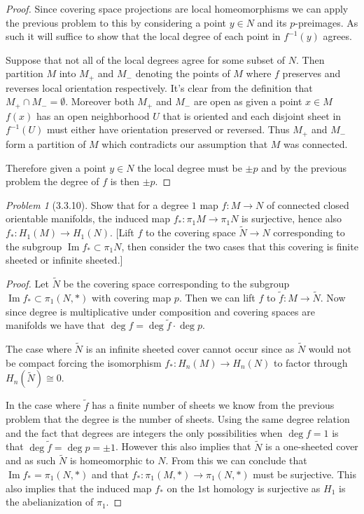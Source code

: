 \documentclass[10pt]{article}
\newcommand{\sk}{\vskip 10mm}
\newcommand{\wt}[1]{\widetilde{#1}}
\DeclareMathOperator{\img}{Im}
\theoremstyle{remark}
\newtheorem{problem}{Problem}
\begin{document}
\begin{proof}
  Since covering space projections are local homeomorphisms we can apply the previous
  problem to this by considering a point $y\in N$ and its $p$-preimages. As such
  it will suffice to show that the local degree of each point in $f^{-1}(y)$
  agrees.

  Suppose that not all of the local degrees agree for some subset of $N$. Then
  partition $M$ into $M_+$ and $M_-$ denoting the points of $M$ where $f$ preserves
  and reverses local orientation respectively. It's clear from the definition
  that $M_+\cap M_-=\emptyset$. Moreover both $M_+$ and $M_-$ are open as given a point $x\in M$
  $f(x)$ has an open neighborhood $U$ that is oriented and each disjoint sheet in
  $f^{-1}(U)$ must either have orientation preserved or reversed. Thus $M_+$ and
  $M_-$ form a partition of $M$ which contradicts our assumption that $M$ was
  connected.

  Therefore given a point $y\in N$ the local degree must be $\pm p$ and by the
  previous problem the degree of $f$ is then $\pm p$.
\end{proof}

\sk

\begin{problem}[3.3.10]
  Show that for a degree $1$ map $f:M\rightarrow N$ of connected closed
  orientable manifolds, the induced map $f_*:\pi_1 M\rightarrow \pi_1 N$ is
  surjective, hence also $f_*:H_1(M)\rightarrow H_1(N)$. [Lift $f$ to the
  covering space $\wt{N}\rightarrow N$ corresponding to the subgroup
  $\img f_*\subset\pi_1 N$, then consider the two cases that this covering is
  finite sheeted or infinite sheeted.]
\end{problem}

\begin{proof}
  Let $\wt{N}$ be the covering space corresponding to the subgroup
  $\img f_* \subset\pi_1(N,*)$ with covering map $p$. Then we can lift $f$
  to $\wt{f}:M\rightarrow\wt{N}$. Now since degree is multiplicative under composition
  and covering spaces are manifolds we have that $\deg f=\deg \wt{f}\cdot \deg p$.

  The case where $\wt{N}$ is an infinite sheeted cover cannot occur since
  as $\wt{N}$ would not be compact forcing the isomorphism $f_*:H_n(M)\rightarrow H_n(N)$
  to factor through $H_n(\wt{N})\cong 0$.
  
  In the case where $\wt{f}$ has a finite number of sheets we know from the previous
  problem that the degree is the number of sheets. Using the same degree relation
  and the fact that degrees are integers the only possibilities when $\deg f=1$
  is that $\deg\wt{f}=\deg p=\pm 1$. However this also implies that $\wt{N}$ is
  a one-sheeted cover and as such $\wt{N}$ is homeomorphic to $N$. From this we
  can conclude that $\img f_*=\pi_1(N,*)$ and that $f_*:\pi_1(M,*)\rightarrow\pi_1(N,*)$ must be
  surjective. This also implies that the induced map $f_*$ on the $1$st homology
  is surjective as $H_1$ is the abelianization of $\pi_1$.
\end{proof}
\end{document}
